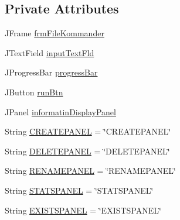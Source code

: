 \subsection*{Private Attributes}
\begin{DoxyCompactItemize}
\item 
J\-Frame \hyperlink{classcom_1_1poly_1_1nlp_1_1filekommander_1_1views_1_1_file_kommander_g_u_i_v2_a98fff3b4c6caac91d624b07beab03af5}{frm\-File\-Kommander}
\item 
J\-Text\-Field \hyperlink{classcom_1_1poly_1_1nlp_1_1filekommander_1_1views_1_1_file_kommander_g_u_i_v2_a43db9456e6f586e8a7d59c86dc90cdc8}{input\-Text\-Fld}
\item 
J\-Progress\-Bar \hyperlink{classcom_1_1poly_1_1nlp_1_1filekommander_1_1views_1_1_file_kommander_g_u_i_v2_a610f5e81072e2d7e81ddd92bcd098295}{progress\-Bar}
\item 
J\-Button \hyperlink{classcom_1_1poly_1_1nlp_1_1filekommander_1_1views_1_1_file_kommander_g_u_i_v2_af49b44fc577331b04d2b14c72b22f716}{run\-Btn}
\item 
J\-Panel \hyperlink{classcom_1_1poly_1_1nlp_1_1filekommander_1_1views_1_1_file_kommander_g_u_i_v2_ac0e47bc8b5d4f38b43baae6b72778c1f}{informatin\-Display\-Panel}
\item 
String \hyperlink{classcom_1_1poly_1_1nlp_1_1filekommander_1_1views_1_1_file_kommander_g_u_i_v2_a66c6acbccbc6788ae6e22fe794336e7d}{C\-R\-E\-A\-T\-E\-P\-A\-N\-E\-L} = \char`\"{}C\-R\-E\-A\-T\-E\-P\-A\-N\-E\-L\char`\"{}
\item 
String \hyperlink{classcom_1_1poly_1_1nlp_1_1filekommander_1_1views_1_1_file_kommander_g_u_i_v2_af0da2862825443e7a472a158906d355b}{D\-E\-L\-E\-T\-E\-P\-A\-N\-E\-L} = \char`\"{}D\-E\-L\-E\-T\-E\-P\-A\-N\-E\-L\char`\"{}
\item 
String \hyperlink{classcom_1_1poly_1_1nlp_1_1filekommander_1_1views_1_1_file_kommander_g_u_i_v2_a824c38073bb8503241bf71f231978a73}{R\-E\-N\-A\-M\-E\-P\-A\-N\-E\-L} = \char`\"{}R\-E\-N\-A\-M\-E\-P\-A\-N\-E\-L\char`\"{}
\item 
String \hyperlink{classcom_1_1poly_1_1nlp_1_1filekommander_1_1views_1_1_file_kommander_g_u_i_v2_aff9a87dc378944cb3ab200905c962ef8}{S\-T\-A\-T\-S\-P\-A\-N\-E\-L} = \char`\"{}S\-T\-A\-T\-S\-P\-A\-N\-E\-L\char`\"{}
\item 
String \hyperlink{classcom_1_1poly_1_1nlp_1_1filekommander_1_1views_1_1_file_kommander_g_u_i_v2_ad849b18df1e4e0a7ba2c34bf01fdaf84}{E\-X\-I\-S\-T\-S\-P\-A\-N\-E\-L} = \char`\"{}E\-X\-I\-S\-T\-S\-P\-A\-N\-E\-L\char`\"{}
\item 

\end{DoxyCompactItemize}
